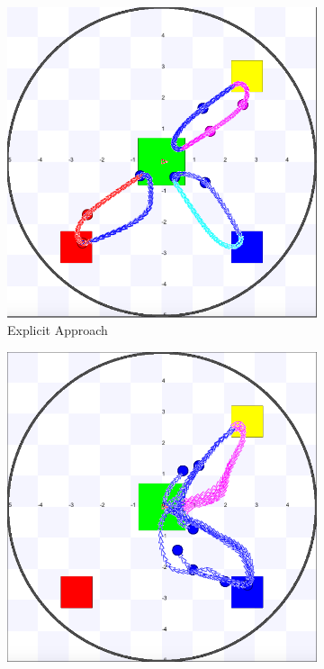 \documentclass[letterpaper, 10 pt, conference]{ieeeconf}  %
\begin{document}
\begin{figure}[h]
  \begin{subfigure}{.25\textwidth}
      \includegraphics[width=0.9\linewidth]{images/explicit/3/raw/8.png}
         \centering
         \caption{Explicit Approach}
   \end{subfigure}%
     \begin{subfigure}{.25\textwidth}
       \includegraphics[width=0.9\linewidth]{images/embodied/3/raw/8.png}

\end{subfigure}
\end{figure}
\end{document}
